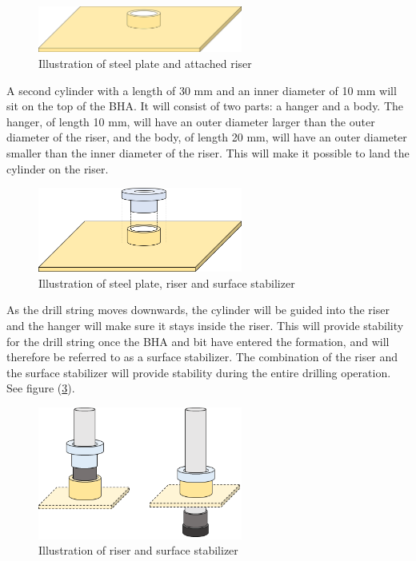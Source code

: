 \begin{figure} [H]
\centering
\includegraphics[width=0.6\textwidth]{figures/riser.png}
\caption{Illustration of steel plate and attached riser}
\label{fig:riser}
\end{figure}

A second cylinder with a length of 30 mm and an inner diameter of 10 mm will sit on the top of the BHA. It will consist of two parts: a hanger and a body. The hanger, of length 10 mm, will have an outer diameter larger than the outer diameter of the riser, and the body, of length 20 mm, will have an outer diameter smaller than the inner diameter of the riser. This will make it possible to land the cylinder on the riser.

\begin{figure} [H]
\centering
\includegraphics[width=0.6\textwidth]{figures/surfacestabilizer.png}
\caption{Illustration of steel plate, riser and surface stabilizer}
\label{fig:surfacestabilizer}
\end{figure}

As the drill string moves downwards, the cylinder will be guided into the riser and the hanger will make sure it stays inside the riser. This will provide stability for the drill string once the BHA and bit have entered the formation, and will therefore be referred to as a surface stabilizer. The combination of the riser and the surface stabilizer will provide stability during the entire drilling operation. See figure (\ref{fig:conductor}).
\begin{figure} [H]
\centering
\includegraphics[width=0.6\textwidth]{figures/ConductorStab.png}
\caption{Illustration of riser and surface stabilizer}
\label{fig:conductor}
\end{figure}


